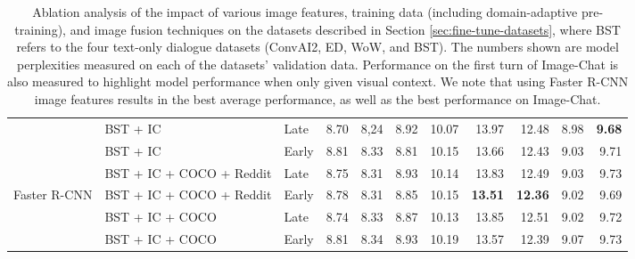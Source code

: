 \documentclass[11pt,a4paper]{article}
\begin{document}
\begin{table*}[t!]
\begin{center}
\begin{tabular}{|l|l|l|r|r|r|r|r|r||r|r| }
 \hline
 \hline
 & BST + IC & Late & 8.70 & 8,24 & 8.92 & 10.07 & 13.97 & 12.48 & 8.98 & \textbf{9.68} \\ 
 & BST + IC & Early& 8.81 & 8.33 & 8.81 & 10.15 & 13.66 & 12.43 & 9.03 & 9.71 \\ 
 & BST + IC + COCO + Reddit& Late & 8.75 & 8.31 & 8.93 & 10.14 & 13.83 & 12.49 & 9.03 & 9.73 \\  
 Faster R-CNN & BST + IC + COCO + Reddit& Early& 8.78 & 8.31 & 8.85 & 10.15 & \textbf{13.51} & \textbf{12.36} & 9.02 & 9.69 \\ 
& BST + IC + COCO& Late & 8.74 & 8.33 & 8.87 & 10.13 & 13.85 & 12.51 & 9.02 & 9.72 \\
 & BST + IC + COCO& Early& 8.81 & 8.34 & 8.93 & 10.19 & 13.57 & 12.39 & 9.07 & 9.73 \\ 
 
 \hline
\end{tabular}
\caption{Ablation analysis of the impact of various image features, training data (including domain-adaptive pre-training), and image fusion techniques on the datasets described in Section \ref{sec:fine-tune-datasets}, where BST refers to the four text-only dialogue datasets (ConvAI2, ED, WoW, and BST). The numbers shown are model perplexities measured on each of the datasets' validation data. Performance on the first turn of Image-Chat is also measured to highlight model performance when only given visual context. We note that using Faster R-CNN image features results in the best average performance, as well as the best performance on Image-Chat. 
\label{table:ablation_results}
}
\end{center}
\end{table*}
\end{document}
